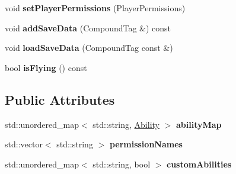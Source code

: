 \begin{DoxyCompactItemize}
\item 
\mbox{\label{struct_abilities_a836858f3ce76726d85d0d707b5962dfc}} 
void {\bfseries set\+Player\+Permissions} (Player\+Permissions)
\item 
\mbox{\label{struct_abilities_ae6ced8d6af2b187eb2b7ae7c8990e05f}} 
void {\bfseries add\+Save\+Data} (Compound\+Tag \&) const
\item 
\mbox{\label{struct_abilities_ae635e620cdf32b19eaab36e713c3a615}} 
void {\bfseries load\+Save\+Data} (Compound\+Tag const \&)
\item 
\mbox{\label{struct_abilities_a67f5249607b8b896ae42159ed93561f0}} 
bool {\bfseries is\+Flying} () const
\end{DoxyCompactItemize}
\subsection*{Public Attributes}
\begin{DoxyCompactItemize}
\item 
\mbox{\label{struct_abilities_ae1a588362f2e8df0b5821a3ded49da24}} 
std\+::unordered\+\_\+map$<$ std\+::string, \mbox{\hyperlink{struct_ability}{Ability}} $>$ {\bfseries ability\+Map}
\item 
\mbox{\label{struct_abilities_a522f5aeb366cc7b7c01c375a9e170e23}} 
std\+::vector$<$ std\+::string $>$ {\bfseries permission\+Names}
\item 
\mbox{\label{struct_abilities_ab5089727aef8fa0593f37b83529365b6}} 
std\+::unordered\+\_\+map$<$ std\+::string, bool $>$ {\bfseries custom\+Abilities}
\end{DoxyCompactItemize}
